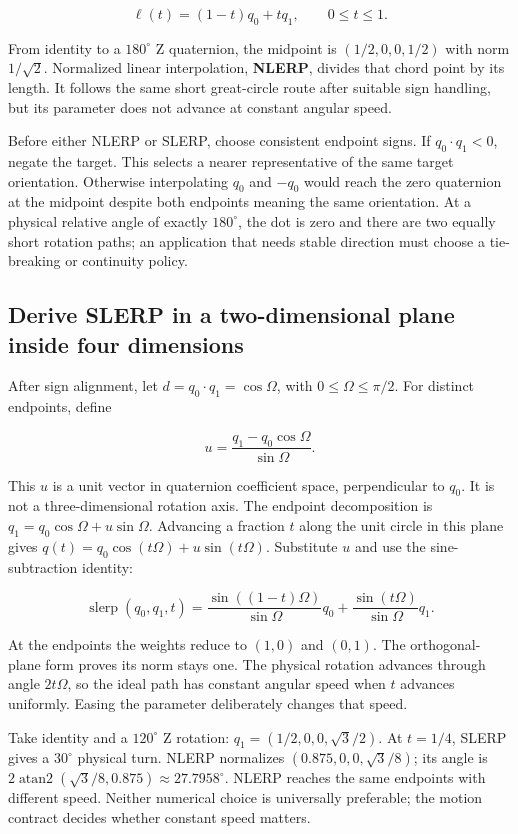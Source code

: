 \[
\ell(t)=(1-t)q_0+tq_1,\qquad 0\le t\le1.
\]

From identity to a \(180^\circ\) Z quaternion, the midpoint is \((1/2,0,0,1/2)\) with norm \(1/\sqrt2\). Normalized linear interpolation, \textbf{NLERP}, divides that chord point by its length. It follows the same short great-circle route after suitable sign handling, but its parameter does not advance at constant angular speed.

Before either NLERP or SLERP, choose consistent endpoint signs. If \(q_0\cdot q_1<0\), negate the target. This selects a nearer representative of the same target orientation. Otherwise interpolating \(q_0\) and \(-q_0\) would reach the zero quaternion at the midpoint despite both endpoints meaning the same orientation. At a physical relative angle of exactly \(180^\circ\), the dot is zero and there are two equally short rotation paths; an application that needs stable direction must choose a tie-breaking or continuity policy.

\subsection{Derive SLERP in a two-dimensional plane inside four dimensions}\label{01-foundations-i-ch019-derive-slerp-in-a-two-dimensional-plane-inside-four-dimensions}

After sign alignment, let \(d=q_0\cdot q_1=\cos\Omega\), with \(0\le\Omega\le\pi/2\). For distinct endpoints, define

\[
u=\frac{q_1-q_0\cos\Omega}{\sin\Omega}.
\]

This \(u\) is a unit vector in quaternion coefficient space, perpendicular to \(q_0\). It is not a three-dimensional rotation axis. The endpoint decomposition is \(q_1=q_0\cos\Omega+u\sin\Omega\). Advancing a fraction \(t\) along the unit circle in this plane gives \(q(t)=q_0\cos(t\Omega)+u\sin(t\Omega)\). Substitute \(u\) and use the sine-subtraction identity:

\[
\operatorname{slerp}(q_0,q_1,t)=
\frac{\sin((1-t)\Omega)}{\sin\Omega}q_0
+\frac{\sin(t\Omega)}{\sin\Omega}q_1.
\]

At the endpoints the weights reduce to \((1,0)\) and \((0,1)\). The orthogonal-plane form proves its norm stays one. The physical rotation advances through angle \(2t\Omega\), so the ideal path has constant angular speed when \(t\) advances uniformly. Easing the parameter deliberately changes that speed.

Take identity and a \(120^\circ\) Z rotation: \(q_1=(1/2,0,0,\sqrt3/2)\). At \(t=1/4\), SLERP gives a \(30^\circ\) physical turn. NLERP normalizes \((0.875,0,0,\sqrt3/8)\); its angle is \(2\operatorname{atan2}(\sqrt3/8,0.875)\approx27.7958^\circ\). NLERP reaches the same endpoints with different speed. Neither numerical choice is universally preferable; the motion contract decides whether constant speed matters.

